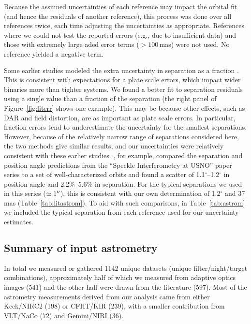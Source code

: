 \documentclass[twocolumn]{aastex62}
\begin{document}
Because the assumed uncertainties of each reference may impact the orbital fit (and hence the residuals of another reference), this process was done over all references twice, each time adjusting the uncertainties as appropriate. References where we could not test the reported errors (e.g., due to insufficient data) and those with extremely large aded error terms ($>100$\,mas) were not used. No reference yielded a negative term. 

Some earlier studies modeled the extra uncertainty in separation as a fraction \citep[e.g.,][]{Hrt2008,Hor2011,Tok2012d}. This is consistent with expectations for a plate scale errors, which impact wider binaries more than tighter systems. We found a better fit to separation residuals using a single value than a fraction of the separation (the right panel of Figure~\ref{fig:literr} shows one example). This may be because other effects, such as DAR and field distortion, are as important as plate scale errors. In particular, fraction errors tend to underestimate the uncertainty for the smallest separations. However, because of the relatively narrow range of separations considered here, the two methods give similar results, and our uncertainties were relatively consistent with these earlier studies. \citet{2007AJ....134.1671M}, for example, compared the separation and position angle predictions from the ``Speckle Interferometry at USNO'' paper series to a set of well-characterized orbits and found a scatter of 1.1$^{\circ}$--1.2$^{\circ}$ in position angle and 2.2\%--5.6\% in separation. For the typical separations we used in this series ($\simeq1\mbox{$^{\prime\prime}$}$), this is consistent with our own determination of 1.2$^{\circ}$ and 37\,mas (Table~\ref{tab:litastrom}). To aid with such comparisons, in Table~\ref{tab:astrom} we included the typical separation from each reference used for our uncertainty estimates.


\subsection{Summary of input astrometry}

In total we measured or gathered 1142 unique datasets (unique filter/night/target combinations), approximately half of which we measured from adaptive optics images (541) and the other half were drawn from the literature (597). Most of the astrometry measurements derived from our analysis came from either Keck/NIRC2 (198) or CFHT/KIR (239), with a smaller contribution from VLT/NaCo (72) and Gemini/NIRI (36). 
\end{document}
